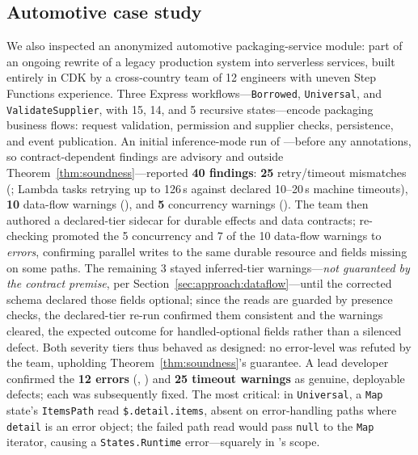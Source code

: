 \subsection{Automotive case study}
\label{sec:eval:automotive}
We also inspected an anonymized automotive packaging-service module: part of
an ongoing rewrite of a legacy production system into serverless services,
built entirely in CDK by a cross-country team of 12 engineers with uneven
Step Functions experience. Three Express workflows---\texttt{Borrowed},
\texttt{Universal}, and \texttt{ValidateSupplier}, with 15, 14, and 5
recursive \asl{} states---encode packaging business flows: request
validation, permission and supplier checks, persistence, and event
publication. An initial inference-mode run of \tool{}---before any
annotations, so contract-dependent findings are advisory and outside
Theorem~\ref{thm:soundness}---reported \textbf{40 findings}:
\textbf{25} retry/timeout mismatches (; Lambda tasks retrying
up to 126\,s against declared 10--20\,s machine timeouts), \textbf{10}
data-flow warnings (), and \textbf{5} concurrency warnings
(). The team then authored a declared-tier sidecar for durable
effects and data contracts; re-checking promoted the 5 concurrency and 7 of
the 10 data-flow warnings to \emph{errors}, confirming parallel writes to
the same durable resource and fields missing on some paths. The remaining
3 stayed inferred-tier warnings---\emph{not guaranteed by the contract
premise}, per Section~\ref{sec:approach:dataflow}---until the corrected
schema declared those fields optional; since the reads are guarded by
presence checks, the declared-tier re-run confirmed them consistent and the
warnings cleared, the expected outcome for handled-optional fields rather
than a silenced defect. Both severity tiers thus behaved as designed: no
error-level  was refuted by the team, upholding
Theorem~\ref{thm:soundness}'s guarantee. A lead developer confirmed the
\textbf{12 errors} (, ) and \textbf{25 timeout
warnings} as genuine, deployable defects; each was subsequently fixed. The
most critical: in \texttt{Universal}, a \texttt{Map} state's
\texttt{ItemsPath} read \texttt{\$.detail.items}, absent on
error-handling paths where \texttt{detail} is an error object; the failed
path read would pass \texttt{null} to the \texttt{Map} iterator, causing a
\texttt{States.Runtime} error---squarely in 's scope. 
